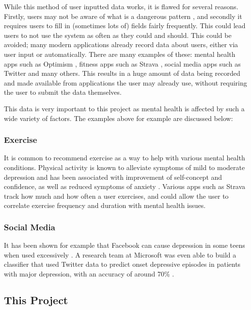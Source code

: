 \documentclass[11pt,openright,a4paper]{report}
\begin{document}
While this method of user inputted data works, it is flawed for several reasons. Firstly, users may not be aware of what is a dangerous pattern \parencite{pimentalhealth}, and secondly it requires users to fill in (sometimes lots of) fields fairly frequently. This could lead users to not use the system as often as they could and should. This could be avoided; many modern applications already record data about users, either via user input or automatically. There are many examples of these: mental health apps such as Optimism \parencite{optimism}, fitness apps such as Strava \parencite{strava}, social media apps such as Twitter \parencite{twitter} and many others. This results in a huge amount of data being recorded and made available from applications the user may already use, without requiring the user to submit the data themselves.

This data is very important to this project as mental health is affected by such a wide variety of factors. The examples above for example are discussed below:

\subsubsection{Exercise}
It is common to recommend exercise as a way to help with various mental health conditions. Physical activity is known to alleviate symptoms of mild to moderate depression and has been associated with improvement of self-concept and confidence, as well as reduced symptoms of anxiety \parencite{exercisementalhealth}. Various apps such as Strava \parencite{strava} track how much and how often a user exercises, and could allow the user to correlate exercise frequency and duration with mental health issues.

\subsubsection{Social Media}
It has been shown for example that Facebook can cause depression in some teens when used excessively \parencite{fbdepressionteens}. A research team at Microsoft was even able to build a classifier that used Twitter data to predict onset depressive episodes in patients with major depression, with an accuracy of around 70\% \parencite{de2013predicting}.

\subsection{This Project}
\end{document}

